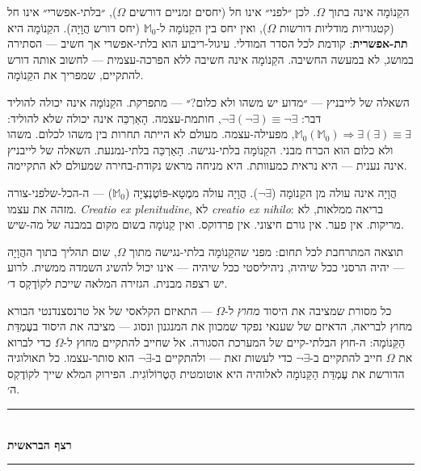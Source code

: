 \documentclass[10pt, openany, oneside]{book}
\renewcommand{\normalsize}{\fontsize{10}{13}\selectfont}
\begin{document}
הקֵנוֹמָה אינה בתוך $\Omega$. לכן ״לפני״ אינו חל (יחסים זמניים דורשים $\Omega$), ״בלתי-אפשרי״ אינו חל (קטגוריות מודליות דורשות $\Omega$), ואין יחס בין הקֵנוֹמָה ל-$\mathbb{M}_0$ (יחס דורש הֲוָיָה). הקֵנוֹמָה היא \textbf{תת-אפשרית}: קודמת לכל הסדר המודלי. עיגול-ריבוע הוא בלתי-אפשרי אך חשיב — הסתירה במושג, לא במעשה החשיבה. הקֵנוֹמָה אינה חשיבה ללא הפרכה-עצמית — לחשוב אותה דורש להתקיים, שמפריך את הקֵנוֹמָה.

השאלה של לייבניץ — ״מדוע יש משהו ולא כלום?״ — מתפרקת. הקֵנוֹמָה אינה יכולה להוליד דבר: $\neg\exists(\neg\exists) \equiv \neg\exists$, חותמת-עצמה. הָאַרְכֵּה אינה יכולה שלא להוליד: $\mathbb{M}_0(\mathbb{M}_0) \Rightarrow \exists(\exists) \equiv \exists$, מפעילה-עצמה. מעולם לא הייתה תחרות בין משהו לכלום. משהו ולא כלום הוא הכרח מבני. הקֵנוֹמָה בלתי-נגישה. הָאַרְכֵּה בלתי-נמנעת. השאלה של לייבניץ אינה נענית — היא נראית כמעוותת. היא מניחה מראש נקודת-בחירה שמעולם לא התקיימה.

הֲוָיָה אינה עולה מן הקֵנוֹמָה ($\neg\exists$). הֲוָיָה עולה ממֶטָא-פּוֹטֶנְצְיָה ($\mathbb{M}_0$) — ה-הכל-שלפני-צורה מזהה את עצמו. \textit{Creatio ex plenitudine}, לא \textit{creatio ex nihilo}: בריאה ממלאות, לא מריקות. אין פער. אין גורם חיצוני. אין פרדוקס. ואין קֵנוֹמָה בשום מקום במבנה של מה-שיש.

תוצאה המתרחבת לכל תחום: מפני שהקֵנוֹמָה בלתי-נגישה מתוך $\Omega$, שום תהליך בתוך ההֲוָיָה — יהיה הרסני ככל שיהיה, ניהיליסטי ככל שיהיה — אינו יכול להשיג השמדה ממשית. לרוע יש רצפה מבנית. הגזירה המלאה שייכת לקוֹדֶקְס ד׳.

כל מסורת שמציבה את היסוד \textit{מחוץ} ל-$\Omega$ — התאיזם הקלאסי של אל טרנסצנדנטי הבורא מחוץ לבריאה, הדאיזם של שענאי נפקד שמכוון את המנגנון ונסוג — מציבה את היסוד בעֶמְדַּת הַקֵּנוֹמָה: ה-חוץ הבלתי-קיים של המערכת הסגורה. אל שחייב להתקיים מחוץ ל-$\Omega$ כדי לברוא את $\Omega$ חייב להתקיים ב-$\neg\exists$ כדי לעשות זאת — ולהתקיים ב-$\neg\exists$ הוא סותר-עצמו. כל תאולוגיה הדורשת את עֶמְדַּת הַקֵּנוֹמָה לאלוהיה היא אוטומטית הֶטֶרוֹלוֹגִית. הפירוק המלא שייך לקוֹדֶקְס ה׳.


\vspace{1.5em}

\begin{center}
    \rule{0.3\textwidth}{0.4pt}\\[0.5em]
    {\normalsize\bfseries\textsc{רצף הבראשית}}\\[0.3em]
    \rule{0.3\textwidth}{0.4pt}
\end{center}
\end{document}

